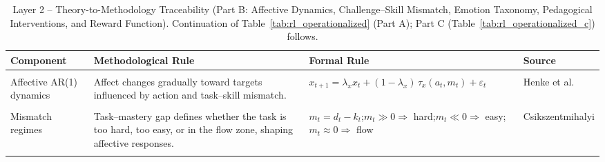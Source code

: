 \renewcommand{\arraystretch}{1.7}
\begin{table}[H]
\centering
\small
\caption{Layer 2 -- Theory-to-Methodology Traceability (Part B: Affective Dynamics, Challenge--Skill Mismatch, Emotion Taxonomy, Pedagogical Interventions, and Reward Function). Continuation of Table~\ref{tab:rl_operationalized} (Part A); Part C (Table~\ref{tab:rl_operationalized_c}) follows.}
\label{tab:rl_operationalized_b}
\begin{tabular}{>{\raggedright\arraybackslash}p{2.4cm}
                >{\raggedright\arraybackslash}p{5.0cm}
                >{\raggedright\arraybackslash}p{4.0cm}
                >{\raggedright\arraybackslash}p{2.2cm}}
\toprule
\textbf{Component} & \textbf{Methodological Rule} & \textbf{Formal Rule} & \textbf{Source} \\
\midrule
\multicolumn{4}{@{\hspace{0.3em}}l}{\small\bfseries Affective Dynamics} \\
\midrule

Affective AR(1) dynamics
    & Affect changes gradually toward targets influenced by action and task–skill mismatch.
    & $x_{t+1} = \lambda_x x_t + (1{-}\lambda_x)\,\tau_x(a_t, m_t) + \varepsilon_t$
    & Henke et al. \cite{henke_dsem_2026} \\

\midrule
\multicolumn{4}{@{\hspace{0.3em}}l}{\small\bfseries Challenge--Skill Mismatch} \\
\midrule

Mismatch regimes
    & Task–mastery gap defines whether the task is too hard, too easy, or in the flow zone, shaping affective responses.
    & $m_t = d_t - k_t$;\newline $m_t \gg 0 \Rightarrow$ hard;\newline $m_t \ll 0 \Rightarrow$ easy;\newline $m_t \approx 0 \Rightarrow$ flow
    & Csikszentmihalyi \cite{csikszentmihalyi_flow_1990} \\

\midrule
\multicolumn{4}{@{\hspace{0.3em}}l}{\small\bfseries Emotion Taxonomy and Discretisation} \\
\midrule


\end{tabular}
\end{table}
